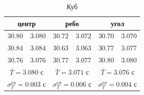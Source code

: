 \documentclass[a4paper,12pt]{article}
\begin{document}
\begin{enumerate}
    \begin{table}[!h]
        \centering
        \begin{tabular}{|c|c|c|c|c|c|} \hline
            \multicolumn{2}{|c}{центр} & \multicolumn{2}{|c}{ребо} & \multicolumn{2}{|c|}{угол} \\ \hline
            $30.80$ & $3.080$ & $30.72$ & $3.072$ & $30.70$ & $3.070$ \\ \hline
            $30.84$ & $3.084$ & $30.63$ & $3.063$ & $30.77$ & $3.077$ \\ \hline
            $30.76$ & $3.076$ & $30.77$ & $3.077$ & $30.80$ & $3.080$ \\ \hline
            \multicolumn{2}{|c|}{$\overline{T} = 3.080$ с} & \multicolumn{2}{|c|}{$\overline{T} = 3.071$ с} & \multicolumn{2}{|c|}{$\overline{T} = 3.076$ с} \\ 
            \multicolumn{2}{|c|}{$\sigma_T^{\text{сл}} = 0.003$ с} & \multicolumn{2}{|c|}{$\sigma_T^{\text{сл}} = 0.006$ с} & \multicolumn{2}{|c|}{$\sigma_T^{\text{сл}} = 0.004$ с} \\ \hline
        \end{tabular}
        \caption{Куб}
    \end{table}


\end{enumerate}
\end{document}

